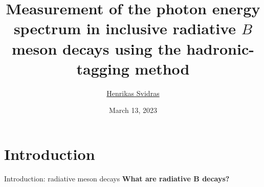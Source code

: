 \documentclass[xcolor=dvipsnames]{beamer}
\title[\meeting]{Measurement of the photon energy spectrum in
inclusive radiative \texorpdfstring{$B$}{B} meson decays using the
hadronic-tagging method} %
\author[Henrikas Svidras]{\texorpdfstring{\footnotesize \underline{Henrikas Svidras}}{Henrikas Svidras}} %
\institute[DESY] %
{
\text{\large \meeting}
\vspace{-10pt}
}
\date{March 13, 2023} %
\begin{document}
{ 
\begin{frame}
\titlepage %
\end{frame}
}
\addtocounter{framenumber}{-1}

\section{Introduction}
\begin{frame}{Introduction: radiative \safeB meson decays}
\centering
\textbf{What are radiative $\bm{B}$ decays?}

   
   
   
\end{frame}
\end{document}
